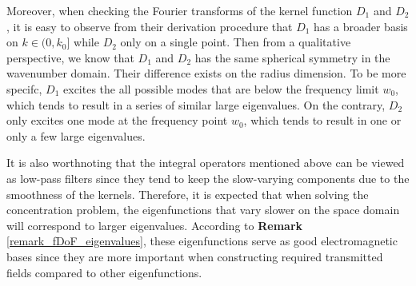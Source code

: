 \documentclass[12pt,draftclsnofoot,journal,onecolumn]{IEEEtran}
\begin{document}
{Moreover, when checking the Fourier transforms of the kernel function $D_1$ and $D_2$, it is easy to observe from their derivation procedure that $D_1$ has a broader basis on $k \in (0,k_0]$ while $D_2$ only on a single point. Then from a qualitative perspective, we know that $D_1$ and $D_2$ has the same spherical symmetry in the wavenumber domain. Their difference exists on the radius dimension. To be more specifc,
$D_1$ excites the all possible modes that are below the frequency limit $w_0$, which tends to result in a series of similar large eigenvalues. On the contrary, $D_2$ only excites one mode at the frequency point $w_0$, which tends to result in one or only a few large eigenvalues. 

It is also worthnoting that the integral operators mentioned above can be viewed as low-pass filters since they tend to keep the slow-varying components due to the smoothness of the kernels. Therefore, it is expected that when solving the concentration problem, the eigenfunctions that vary slower on the space domain will correspond to larger eigenvalues. According to {\bf Remark} \ref{remark_fDoF_eigenvalues}, these eigenfunctions serve as good electromagnetic bases since they are more important when constructing required transmitted fields compared to other eigenfunctions.
}
   
\end{document}
